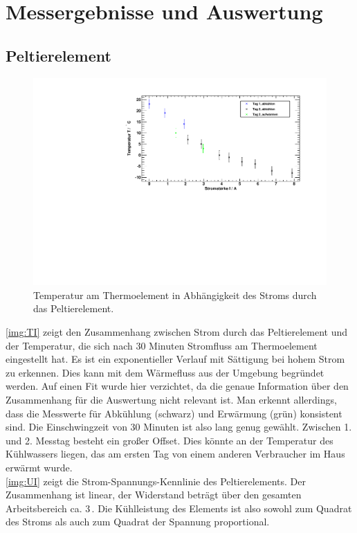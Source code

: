 \section{Messergebnisse und Auswertung}
\subsection{Peltierelement}

\begin{figure}[H]
\begin{center}
  \includegraphics[width=\textwidth]{../img/graph_T-I.pdf}
  \caption{Temperatur am Thermoelement
  in Abhängigkeit des Stroms durch das Peltierelement.}
  \label{img:TI}
\end{center}
\end{figure}

\autoref{img:TI} zeigt den Zusammenhang zwischen Strom durch das Peltierelement
und der Temperatur, die sich nach 30 Minuten Stromfluss am Thermoelement eingestellt hat.
Es ist ein exponentieller Verlauf mit Sättigung bei hohem Strom zu erkennen.
Dies kann mit dem Wärmefluss aus der Umgebung begründet werden.
Auf einen Fit wurde hier verzichtet, da die genaue Information über den Zusammenhang
für die Auswertung nicht relevant ist.
Man erkennt allerdings, dass die Messwerte für Abkühlung (schwarz) und Erwärmung (grün) konsistent sind.
Die Einschwingzeit von 30 Minuten ist also lang genug gewählt.
Zwischen 1. und 2. Messtag besteht ein großer Offset.
Dies könnte an der Temperatur des Kühlwassers liegen,
das am ersten Tag von einem anderen Verbraucher im Haus erwärmt wurde.\\
\autoref{img:UI} zeigt die Strom-Spannungs-Kennlinie des Peltierelements.
Der Zusammenhang ist linear, der Widerstand beträgt über den gesamten Arbeitsbereich ca. 3\,\textOmega.
Die Kühlleistung des Elements ist also sowohl zum Quadrat des Stroms als auch zum Quadrat der Spannung proportional.



